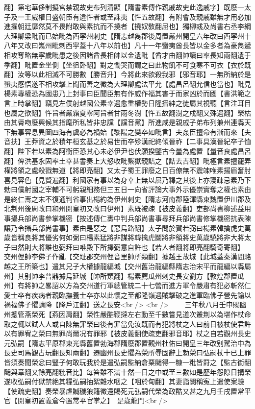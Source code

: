翻】第宅華侈制擬宫禁親故吏布列清顯【隋書素傳作親戚故吏此逸戚字】既廢一太子及一王威權日盛朝臣有違忤者或至誅夷【忤五故翻】有附會及親戚雖無才用必加進擢朝廷靡然莫不畏附敢與素抗而不撓者【撓奴敎翻屈也】獨柳彧及尚書右丞李綱大理卿梁毗而已始毗為西寜州刺史【隋志越雋郡後周置嚴州開皇六年改曰西寜州十八年又改曰嶲州毗刺西寜蓋十八年以前也】凡十一年蠻夷酋長皆以金多者為豪雋遞相攻奪略無寜歲毗患之後因諸酋長相帥以金遺毗【酋才由翻帥讀曰率長知兩翻遺于季翻】毗置金坐側【坐徂卧翻】對之慟哭而謂之曰此物飢不可食寒不可衣【衣於既翻】汝等以此相滅不可勝數【勝音升】今將此來欲殺我邪【邪音耶】一無所納於是蠻夷感悟遂不相攻擊上聞而善之徵為大理卿處法平允【處昌呂翻允信也當也】毗見楊素專權恐為國患乃上封事曰臣聞臣無有作威作福其害于而家凶於而國【書洪範之言上時掌翻】竊見左僕射越國公素幸遇愈重權勢日隆搢紳之徒屬其視聽【言注耳目也屬之欲翻】忤旨者嚴霜夏零阿旨者甘雨冬澍【忤五故翻澍之戍翻又殊遇翻】榮枯由其脣吻廢興候其指麾所私皆非忠讜【讜音黨】所進咸是親戚子弟布列兼州連縣天下無事容息異圖四海有虞必為禍始【黎陽之變卒如毗言】夫姦臣擅命有漸而來【夫音扶】王莽資之於積年桓玄基之於易世而卒殄漢祀終傾晉祚【二事具漢晉紀卒子恤翻】陛下若以素為阿衡臣恐其心未必伊尹也伏願揆鑒古今量為處置【量音良處昌呂翻】俾洪基永固率土幸甚書奏上大怒收毗繫獄親詰之【詰去吉翻】毗極言素擅寵弄權將領之處殺戮無道【將即亮翻】又太子蜀王罪廢之日百僚無不震竦唯素揚眉奮肘喜見容色【見賢遍翻】利國家有事以為身幸上無以屈乃釋之其後上亦寖疎忌素乃下勅曰僕射國之宰輔不可躬親細務但三五日一向省評論大事外示優崇實奪之權也素由是終仁夀之末不復通判省事出楊約為伊州刺史【隋志河南郡陸渾縣東魏置伊川郡及北荆州後周改曰和州開皇初又改曰伊州】素既被疎【被皮義翻】吏部尚書柳述益用事攝兵部尚書參掌機密【按述傳仁夀中判兵部尚書事尋拜兵部尚書修掌機密抗表陳讓乃令攝兵部尚書事】素由是惡之【惡烏路翻】太子問於賀若弼曰楊素韓擒虎史萬歲皆稱良將其優劣何如弼曰楊素猛將非謀將韓擒虎鬬將非領將史萬歲驍將非大將太子曰然則大將誰也弼拜曰唯殿下所擇弼意自許也【若人者翻將即亮翻騎奇寄翻】　交州俚帥李佛子作亂【交趾郡交州俚音里帥所類翻】據越王故城【此城蓋秦漢間駱越之王所築也】遣其兄子大權據龍編城【交州舊治龍編縣隋志治宋平而龍編以縣屬州】其别帥李普鼎據烏延城【帥所類翻】楊素薦瓜州刺史長安劉方【敦煌郡置瓜州】有將帥之畧詔以方為交州道行軍總管統二十七營而進方軍令嚴肅有犯必斬然仁愛士卒有疾病者親臨撫養士卒亦以此懷之至都隆嶺遇賊擊破之進軍臨佛子營先諭以禍福佛子懼請降【降戶江翻】送之長安<br />
<br />
　　三年秋八月壬申賜幽州摠管燕榮死【燕因肩翻】榮性嚴酷鞭撻左右動至千數嘗見道次叢荆以為堪作杖命取之輒以試人人或自陳無罪榮曰後有罪當免汝既而有犯將杖之人曰前日被杖使君許以有罪宥之榮曰無罪尚爾况有罪邪【被皮義翻使疏吏翻邪音耶】杖之自若觀州長史元弘嗣【隋志平原郡東光縣舊置勃海郡隋廢郡置觀州杜佑曰開皇三年改别駕治中為長史司馬觀古玩翻長知兩翻】遷幽州長史懼為榮所辱固辭上勅榮曰弘嗣杖十已上罪皆須奏聞榮忿曰豎子何敢玩我於是遣弘嗣監納倉粟颺得一糠一粃皆罸之【監古衘翻颺與章翻又餘亮翻粃音比】每笞雖不滿十然一日之中或至三數如是歷年怨隙日搆榮遂收弘嗣付獄禁絶其糧弘嗣抽絮雜水咽之【咽於甸翻】其妻詣闕稱寃上遣使案驗【使疏吏翻】奏榮暴虐贓穢狼籍徵還賜死元弘嗣代榮為政酷又甚之九月壬戌置常平官【開皇初置義倉今置常平官掌之】　是歲龍門<br />
